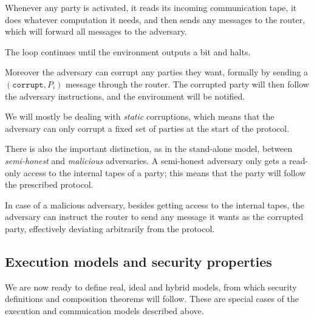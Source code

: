 Whenever any party is activated, it reads its incoming communication tape, it does whatever computation it needs, and then sends any messages to the router, which will forward all messages to the adversary.

The loop continues until the environment outputs a bit and halts.

Moreover the adversary can corrupt any parties they want, formally by sending a $(\texttt{corrupt}, P_i)$ message through the router. The corrupted party will then follow the adversary instructions, and the environment will be notified.

We will mostly be dealing with \emph{static} corruptions, which means that the adversary can only corrupt a fixed set of parties at the start of the protocol.

There is also the important distinction, as in the stand-alone model, between \emph{semi-honest} and \emph{malicious} adversaries. A semi-honest adversary only gets a read-only access to the internal tapes of a party; this means that the party will follow the prescribed protocol.

In case of a malicious adversary, besides getting access to the internal tapes, the adversary can instruct the router to send any message it wants as the corrupted party, effectively deviating arbitrarily from the protocol.

\subsection{Execution models and security properties}

We are now ready to define real, ideal and hybrid models, from which security definitions and composition theorems will follow. These are special cases of the execution and commuication models described above.

